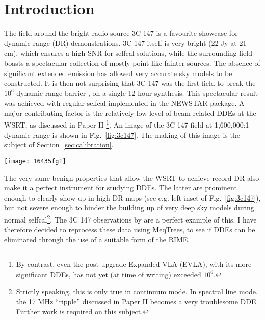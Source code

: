 \documentclass{aa}
\begin{document}
\section*{Introduction}

The field around the bright radio source 3C 147 is a favourite showcase for dynamic range (DR) demonstrations. 3C 147 itself is very bright (22 Jy at 21 cm), which ensures a high SNR for selfcal solutions, while the surrounding field boasts a spectacular collection of mostly point-like fainter sources. The absence of significant extended emission has allowed very accurate sky models to be constructed. It is then not surprising that 3C 147 was the first field to break the $10^6$ dynamic range barrier \citep{deBruyn:million,deBruyn:3c147}, on a single 12-hour synthesis. This spectacular result was achieved with regular selfcal implemented in the NEWSTAR package. A major contributing factor is the relatively low level of beam-related DDEs at the WSRT, as discussed in Paper II \citep[Sect.~2.1]{RRIME2}\footnote{By contrast, even the post-upgrade Expanded VLA (EVLA), with its more significant DDEs, has not yet (at time of writing) exceeded $10^6$.}. An image of the 3C 147 field at 1,600,000:1 dynamic range is shown in Fig.~\ref{fig:3c147}. The making of this image is the subject of Section~\ref{sec:calibration}.

\begin{figure*}
\sidecaption
\centering
\texttt{[image: 16435fg1]}
\caption{\label{fig:3c147} ``Showcase'' image of the field around the bright radio source 3C 147, produced after reduction with MeqTrees. The image is noise-limited, and has a dynamic range of 1.6 million. This DR was already achieved by de Bruyn using regular selfcal in NEWSTAR, but the resulting images contained artefacts around off-axis sources (left inset) due to DDEs. A MeqTrees reduction incorporating differential gains, as described in this paper, has completely eliminated the artefacts (right inset). This image also appears in \citet{meqtrees}.}
\end{figure*}

The very same benign properties that allow the WSRT to achieve record DR also make it a perfect instrument for studying DDEs. The latter are prominent enough to clearly show up in high-DR maps (see e.g. left inset of Fig.~\ref{fig:3c147}), but not severe enough to hinder the building up of very deep sky models during normal selfcal\footnote{Strictly speaking, this is only true in continuum mode. In spectral line mode, the 17 MHz ``ripple'' discussed in Paper II \citep[Sect.~2.1.1]{RRIME2} becomes a very troublesome DDE. Further work is required on this subject.}. The 3C 147 observations by \citet{deBruyn:3c147} are a perfect example of this. I have therefore decided to reprocess these data using MeqTrees, to see if DDEs can be eliminated through the use of a suitable form of the RIME.
\end{document}
